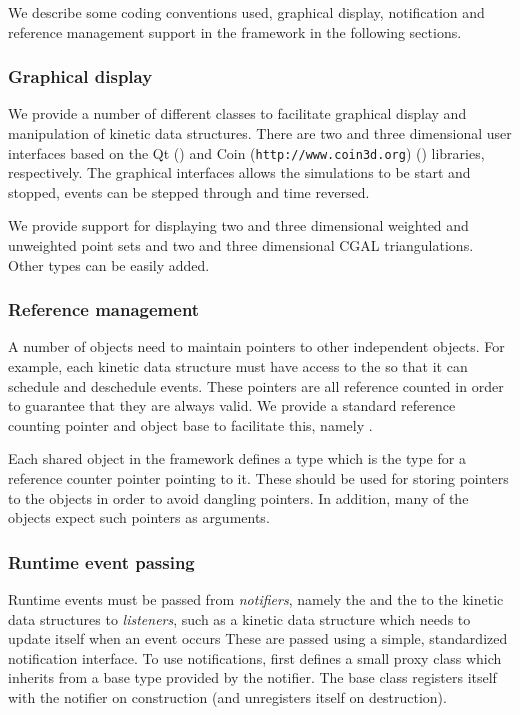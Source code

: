 We describe some coding conventions used, graphical display,
notification and reference management support in the framework in the
following sections.


\subsubsection{Graphical display}

We provide a number of different classes to facilitate graphical
display and manipulation of kinetic data structures. There are two and
three dimensional user interfaces based on the Qt
() and Coin (\texttt{http://www.coin3d.org})
() libraries,
respectively.  The graphical interfaces allows the simulations to be
start and stopped, events can be stepped through and time reversed.

We provide support for displaying two and three dimensional weighted
and unweighted point sets and two and three dimensional CGAL
triangulations. Other types can be easily added.

\subsubsection{Reference management}

A number of objects need to maintain pointers to other independent
objects. For example, each kinetic data structure must have access to
the  so that it can schedule and deschedule events. These
pointers are all reference counted in order to guarantee that they are
always valid. We provide a standard reference counting pointer and
object base to facilitate this, namely .

Each shared object in the framework defines a type  which is the
type for a reference counter pointer pointing to it. These should be
used for storing pointers to the objects in order to avoid dangling
pointers. In addition, many of the objects expect such pointers as
arguments.

\subsubsection{Runtime event passing}

Runtime events must be passed from \textit{notifiers}, namely the
 and the  to the kinetic data structures to
\textit{listeners}, such as a kinetic data structure which needs to
update itself when an event occurs These are passed using a simple,
standardized notification interface. To use notifications, first
defines a small proxy class which inherits from a  base
type provided by the notifier. The  base class registers
itself with the notifier on construction (and unregisters itself on
destruction).


